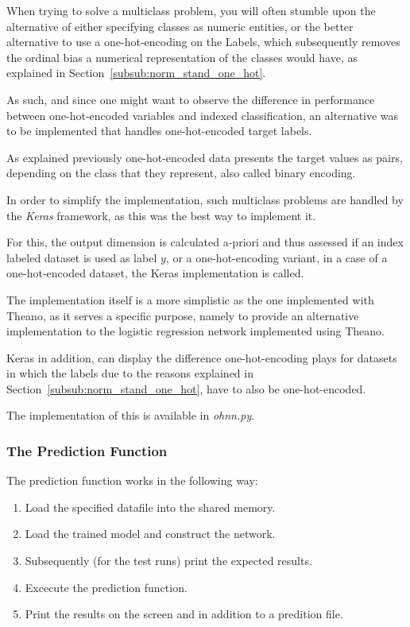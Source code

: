 \documentclass[12pt]{article}
\begin{document}
When trying to solve a multiclass problem, you will often stumble upon the alternative of either specifying classes as numeric entities, or the better alternative to use a one-hot-encoding on the Labels, which subsequently removes the ordinal bias a numerical representation of the classes would have, as explained in Section~\ref{subsub:norm_stand_one_hot}.

As such, and since one might want to observe the difference in performance between one-hot-encoded variables and indexed classification, an alternative was to be implemented that handles one-hot-encoded target labels. 

As explained previously one-hot-encoded data presents the target values as pairs, depending on the class that they represent, also called binary encoding. 

In order to simplify the implementation, such multiclass problems are handled by the \emph{Keras} framework, as this was the best way to implement it. 

For this, the output dimension is calculated a-priori and thus assessed if an index labeled dataset is used as label $y$, or a one-hot-encoding variant, in a case of a one-hot-encoded dataset, the Keras implementation is called. 

The implementation itself is a more simplistic as the one implemented with Theano, as it serves a specific purpose, namely to provide an alternative implementation to the logistic regression network implemented using Theano. 

Keras in addition, can display the difference one-hot-encoding plays for datasets in which the labels due to the reasons explained in Section~\ref{subsub:norm_stand_one_hot}, have to also be one-hot-encoded. 

The implementation of this is available in \emph{ohnn.py}.

\subsubsection{The Prediction Function}
\label{subsub:prediction}

The prediction function works in the following way:
\begin{enumerate}
    \item Load the specified datafile into the shared memory.
    \item Load the trained model and construct the network.
    \item Subsequently (for the test runs) print the expected results.
    \item Excecute the prediction function.
    \item Print the results on the screen and in addition to a predition file.
\end{enumerate}
\end{document}
